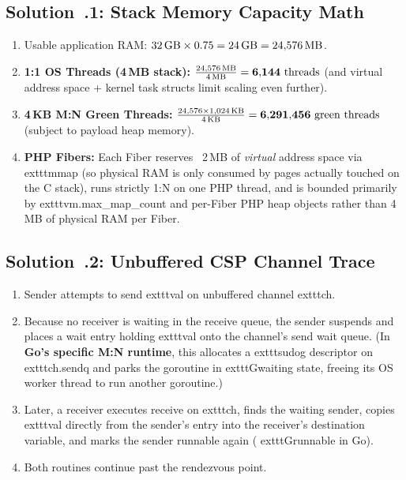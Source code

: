 \subsection{Solution~\thechapter.1: Stack Memory Capacity Math}
\begin{enumerate}[leftmargin=15pt]
  \item Usable application RAM: $32\text{\,GB} \times 0.75 = 24\text{\,GB} = 24{,}576\text{\,MB}$.
  \item \textbf{1:1 OS Threads (4\,MB stack):} $\frac{24{,}576\text{\,MB}}{4\text{\,MB}} = \mathbf{6{,}144\text{ threads}}$ (and virtual address space + kernel task structs limit scaling even further).
  \item \textbf{4\,KB M:N Green Threads:} $\frac{24{,}576 \times 1{,}024\text{\,KB}}{4\text{\,KB}} = \mathbf{6{,}291{,}456\text{ green threads}}$ (subject to payload heap memory).
  \item \textbf{PHP Fibers:} Each Fiber reserves ~2\,MB of \emph{virtual} address space via 	exttt{mmap} (so physical RAM is only consumed by pages actually touched on the C stack), runs strictly 1:N on one PHP thread, and is bounded primarily by 	exttt{vm.max\_map\_count} and per-Fiber PHP heap objects rather than 4\,MB of physical RAM per Fiber.
\end{enumerate}

\subsection{Solution~\thechapter.2: Unbuffered CSP Channel Trace}
\begin{enumerate}[leftmargin=15pt]
  \item Sender attempts to send 	exttt{val} on unbuffered channel 	exttt{ch}.
  \item Because no receiver is waiting in the receive queue, the sender suspends and places a wait entry holding 	exttt{val} onto the channel's send wait queue. (In \textbf{Go's specific M:N runtime}, this allocates a 	exttt{sudog} descriptor on 	exttt{ch.sendq} and parks the goroutine in 	exttt{Gwaiting} state, freeing its OS worker thread to run another goroutine.)
  \item Later, a receiver executes receive on 	exttt{ch}, finds the waiting sender, copies 	exttt{val} directly from the sender's entry into the receiver's destination variable, and marks the sender runnable again (	exttt{Grunnable} in Go).
  \item Both routines continue past the rendezvous point.
\end{enumerate}

